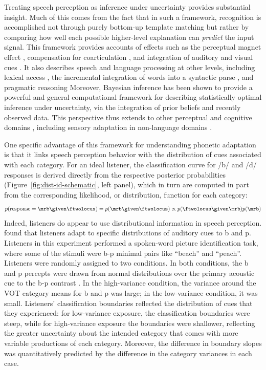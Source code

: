 Treating speech perception as inference under uncertainty provides substantial insight.  Much of this comes from the fact that in such a framework, recognition is accomplished not through purely bottom-up template matching but rather by comparing how well each possible higher-level explanation can \emph{predict} the input signal.
This framework provides accounts of effects such as the perceptual magnet effect \cite{Feldman2009a}, compensation for coarticulation \cite{Sonderegger2010}, and integration of auditory and visual cues \cite{Bejjanki2011}.  It also describes speech and language processing at other levels, including lexical access \cite{Norris2008}, the incremental integration of words into a syntactic parse \cite{Hale2001,Levy2008,Levy2008a}, and pragmatic reasoning \cite{Frank2012,Goodman2013}
Moreover, Bayesian inference has been shown to provide a powerful and general computational framework for describing statistically optimal inference under uncertainty, via the integration of prior beliefs and recently observed data.  This perspective thus extends to other perceptual and cognitive domains \cite{Griffiths2010,Kersten2004,Tenenbaum2001}, including sensory adaptation in non-language domains \cite{Fairhall2001,Kording2007a,Stocker2006}.

One specific advantage of this framework for understanding phonetic adaptation is that it links speech perception behavior with the distribution of cues associated with each category.
For an ideal listener, the classification curve for /b/ and /d/ responses is derived directly from the respective posterior probabilities (Figure~\ref{fig:dist-id-schematic}, left panel), which in turn are computed in part from the corresponding likelihood, or distribution, function for each category:
\begin{equation}
  \label{eq:3}
  p(\mathrm{response} = \mrb \given \ftwolocus) = p(\mrb \given \ftwolocus) \propto p(\ftwolocus\given\mrb) p(\mrb)
\end{equation}
Indeed, listeners do appear to use distributional information in speech perception.   found that listeners adapt to specific distributions of auditory cues to \ph b and \ph p.  Listeners in this experiment performed a spoken-word picture identification task, where some of the stimuli were \ph b-\ph p minimal pairs like ``beach'' and ``peach''.  Listeners were randomly assigned to two conditions. In both conditions, the \ph b and \ph p percepts were drawn from normal distributions over the primary acoustic cue to the \ph b-\ph p contrast \autocite[voice onset timing, VOT,][]{Lisker1964}.  In the high-variance condition, the variance around the VOT category means for \ph b and \ph p was large; in the low-variance condition, it was small.  Listeners' classification boundaries reflected the distribution of cues that they experienced: for low-variance exposure, the classification boundaries were steep, while for high-variance exposure the boundaries were shallower, reflecting the greater uncertainty about the intended category that comes with more variable productions of each category.  Moreover, the difference in boundary slopes was quantitatively predicted by the difference in the category variances in each case.

